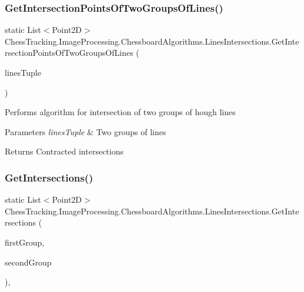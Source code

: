 \subsubsection{\texorpdfstring{GetIntersectionPointsOfTwoGroupsOfLines()}{GetIntersectionPointsOfTwoGroupsOfLines()}}
{\footnotesize\ttfamily static List$<$Point2D$>$ Chess\+Tracking.\+Image\+Processing.\+Chessboard\+Algorithms.\+Lines\+Intersections.\+Get\+Intersection\+Points\+Of\+Two\+Groups\+Of\+Lines (\begin{DoxyParamCaption}\item[{Tuple$<$ Line\+Segment2D\mbox{[}$\,$\mbox{]}, Line\+Segment2D\mbox{[}$\,$\mbox{]}$>$}]{lines\+Tuple }\end{DoxyParamCaption})\hspace{0.3cm}{\ttfamily [static]}}



Performs algorithm for intersection of two groups of hough lines 


\begin{DoxyParams}{Parameters}
{\em lines\+Tuple} & Two groups of lines\\
\hline
\end{DoxyParams}
\begin{DoxyReturn}{Returns}
Contracted intersections
\end{DoxyReturn}
\mbox{\label{class_chess_tracking_1_1_image_processing_1_1_chessboard_algorithms_1_1_lines_intersections_a81062447dc3aa5df1b32354243bd885a}} 
\subsubsection{\texorpdfstring{GetIntersections()}{GetIntersections()}}
{\footnotesize\ttfamily static List$<$Point2D$>$ Chess\+Tracking.\+Image\+Processing.\+Chessboard\+Algorithms.\+Lines\+Intersections.\+Get\+Intersections (\begin{DoxyParamCaption}\item[{Line\+Segment2D \mbox{[}$\,$\mbox{]}}]{first\+Group,  }\item[{Line\+Segment2D \mbox{[}$\,$\mbox{]}}]{second\+Group }\end{DoxyParamCaption})\hspace{0.3cm}{\ttfamily [static]}, {\ttfamily [private]}}



